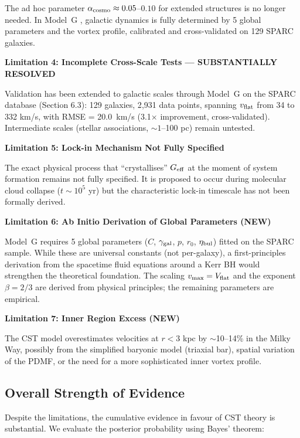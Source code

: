 \documentclass[11pt,a4paper]{article}
\begin{document}
The ad hoc parameter \(\alpha_{\rm cosmo} \approx 0.05\)--\(0.10\) for extended structures is no longer needed. In Model~G \cite{Mo2010}, galactic dynamics is fully determined by 5 global parameters and the vortex profile, calibrated and cross-validated on 129 SPARC galaxies.

\textbf{Limitation 4: Incomplete Cross-Scale Tests --- SUBSTANTIALLY RESOLVED}

Validation has been extended to galactic scales through Model~G on the SPARC database (Section 6.3): 129 galaxies, 2{,}931 data points, spanning \(v_{\rm flat}\) from 34 to 332 km/s, with RMSE = 20.0~km/s (3.1\(\times\) improvement, cross-validated). Intermediate scales (stellar associations, \(\sim 1\)--100 pc) remain untested.

\textbf{Limitation 5: Lock-in Mechanism Not Fully Specified}

The exact physical process that ``crystallises'' \(G_{\rm eff}\) at the
moment of system formation remains not fully specified. It is proposed
to occur during molecular cloud collapse (\(t \sim 10^5\) yr) but the
characteristic lock-in timescale has not been formally derived.

\textbf{Limitation 6: Ab Initio Derivation of Global Parameters (NEW)}

Model~G requires 5 global parameters (\(C\), \(\gamma_{\rm gal}\), \(p\), \(r_0\), \(\eta_{\rm bul}\)) fitted on the SPARC sample. While these are universal constants (not per-galaxy), a first-principles derivation from the spacetime fluid equations around a Kerr BH would strengthen the theoretical foundation. The scaling \(v_{\rm max} = V_{\rm flat}\) and the exponent \(\beta = 2/3\) are derived from physical principles; the remaining parameters are empirical.

\textbf{Limitation 7: Inner Region Excess (NEW)}

The CST model overestimates velocities at \(r < 3\) kpc by \(\sim\)10--14\% in the Milky Way, possibly from the simplified baryonic model (triaxial bar), spatial variation of the PDMF, or the need for a more sophisticated inner vortex profile.

\hypertarget{overall-strength-of-evidence}{%
\subsection{Overall Strength of
Evidence}\label{overall-strength-of-evidence}}

Despite the limitations, the cumulative evidence in favour of CST theory
is substantial. We evaluate the posterior probability using Bayes'
theorem:
\end{document}
